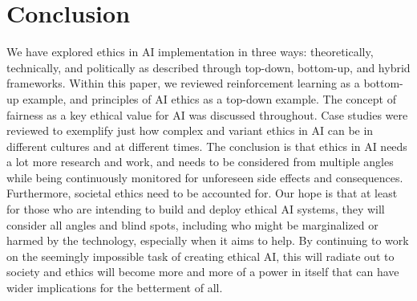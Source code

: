 \documentclass{svproc}
\begin{document}
\section{Conclusion
}
We have explored ethics in AI implementation in three ways:  theoretically, technically, and politically as described through top-down, bottom-up, and hybrid frameworks. Within this paper, we reviewed reinforcement learning as a bottom-up example, and principles of AI ethics as a top-down example. The concept of fairness as a key ethical value for AI was discussed throughout. Case studies were reviewed to exemplify just how complex and variant ethics in AI can be in different cultures and at different times. The conclusion is that ethics in AI needs a lot more research and work, and needs to be considered from multiple angles while being continuously monitored for unforeseen side effects and consequences. Furthermore, societal ethics need to be accounted for. Our hope is that at least for those who are intending to build and deploy ethical AI systems, they will consider all angles and blind spots, including who might be marginalized or harmed by the technology, especially when it aims to help. By continuing to work on the seemingly impossible task of creating ethical AI, this will radiate out to society and ethics will become more and more of a power in itself that can have wider implications for the betterment of all. 



%
%


\end{document}
